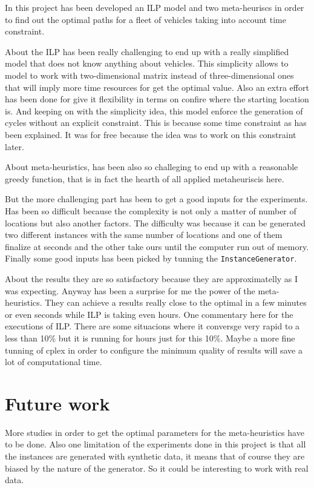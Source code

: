 \documentclass[]{report}
\begin{document}
In this project has been developed an ILP model and two meta-heuriscs in order to find out the optimal paths for a fleet of vehicles taking into account time constraint.

About the ILP has been really challenging to end up with a really simplified model that does not know anything about vehicles. This simplicity allows to model to work with two-dimensional matrix instead of three-dimensional ones that will imply more time resources for get the optimal value. Also an extra effort has been done for give it flexibility in terms on confire where the starting location is. And keeping on with the simplicity idea, this model enforce the generation of cycles without an explicit constraint. This is because some time constraint as has been explained. It was for free because the idea was to work on this constraint later.

About meta-heuristics, has been also so challeging to end up with a reasonable greedy function, that is in fact the hearth of all applied metaheuriscis here.

But the more challenging part has been to get a good inputs for the experiments. Has been so difficult because the complexity is not only a matter of number of locations but also another factors. The difficulty was because it can be generated two different instances with the same number of locations and one of them finalize at seconds and the other take ours until the computer run out of memory. Finally some good inputs has been picked by tunning the {\tt InstanceGenerator}.

About the results they are so satisfactory because they are approximatelly as I was expecting. Anyway has been a surprise for me the power of the meta-heuristics. They can achieve a results really close to the optimal in a few minutes or even seconds while ILP is taking even hours. One commentary here for the executions of ILP. There are some situacions where it conversge very rapid to a less than 10\% but it is running for hours just for this 10\%. Maybe a more fine tunning of cplex in order to configure the minimum quality of results will save a lot of computational time. 

\section{Future work}

More studies in order to get the optimal parameters for the meta-heuristics have to be done. Also one limitation of the experiments done in this project is that all the instances are generated with synthetic data, it means that of course they are biased by the nature of the generator. So it could be interesting to work with real data.
\end{document}
